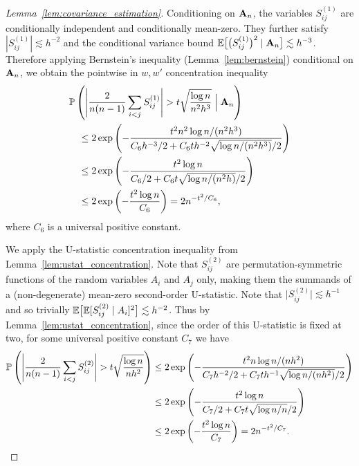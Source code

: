 \begin{proof}[Lemma~\ref{lem:covariance_estimation}]
  Conditioning on $\bA_n$,
  the variables $S_{i j}^{(1)}$
  are conditionally independent
  and conditionally mean-zero.
  They further satisfy
  $|S_{i j}^{(1)}| \lesssim h^{-2}$
  and the conditional variance bound
  $\E\big[\big( S_{i j}^{(1)} \big)^2 \mid \bA_n \big] \lesssim h^{-3}$.
  Therefore applying Bernstein's inequality
  (Lemma~\ref{lem:bernstein})
  conditional on $\bA_n$,
  we obtain the pointwise in $w,w'$
  concentration inequality
  \begin{align*}
    &\P\left(
      \Bigg|
      \frac{2}{n(n-1)}
      \sum_{i<j}
      S_{i j}^{(1)}
      \Bigg|
      > t
      \sqrt{\frac{\log n}{n^2h^3}}
      \Bigm\vert \bA_n
    \right) \\
    &\quad\leq
    2 \exp\left(
      - \frac{t^2 n^2 \log n / (n^2h^3)}
      {C_6 h^{-3} / 2 + C_6 t h^{-2} \sqrt{\log n / (n^2h^3)} / 2}
    \right) \\
    &\quad\leq
    2 \exp\left(
      - \frac{t^2 \log n}
      {C_6 / 2 + C_6 t \sqrt{\log n / (n^2h)} / 2}
    \right) \\
    &\quad\leq
    2 \exp\left(
      - \frac{t^2 \log n}{C_6}
    \right)
    =
    2 n^{-t^2 / C_6},
  \end{align*}
  where $C_6$ is a universal positive constant.


  We apply the U-statistic concentration inequality from
  Lemma~\ref{lem:ustat_concentration}.
  Note that $S_{i j}^{(2)}$
  are permutation-symmetric functions of
  the random variables
  $A_i$ and $A_j$ only,
  making them the summands of
  a (non-degenerate) mean-zero second-order U-statistic.
  Note that
  $\big|S_{i j}^{(2)}\big| \lesssim h^{-1}$
  and so trivially
  $\E\big[\E[S_{i j}^{(2)} \mid A_i ]^2 \big] \lesssim h^{-2}$.
  Thus by Lemma~\ref{lem:ustat_concentration},
  since the order of this U-statistic is fixed at two,
  for some universal positive constant $C_7$ we have
  \begin{align*}
    \P\left(
      \Bigg|
      \frac{2}{n(n-1)}
      \sum_{i<j}
      S_{i j}^{(2)}
      \Bigg|
      > t
      \sqrt{\frac{\log n}{n h^2}}
    \right)
    &\leq
    2 \exp\left(
      - \frac{t^2 n \log n / (n h^2)}
      {C_7 h^{-2} / 2 + C_7 t h^{-1} \sqrt{\log n / (n h^2)} / 2}
    \right) \\
    &\leq
    2 \exp\left(
      - \frac{t^2 \log n}
      {C_7 / 2 + C_7 t \sqrt{\log n / n} / 2}
    \right) \\
    &\leq
    2 \exp\left(
      - \frac{t^2 \log n}{C_7}
    \right)
    =
    2 n^{-t^2 / C_7}.
  \end{align*}


\end{proof}
